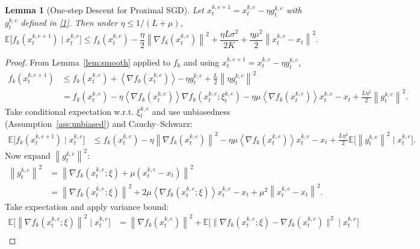 \documentclass{article}
\newtheorem{lemma}{Lemma}
\newcommand{\E}{\mathbb{E}}
\newcommand{\norm}[1]{\left\lVert#1\right\rVert}
\newcommand{\inner}[1]{\left\langle#1\right\rangle}
\begin{document}
\begin{lemma}[One‑step Descent for Proximal SGD]\label{lem:one_step}
Let $x_{t}^{k,e+1}=x_{t}^{k,e}-\eta g_{t}^{k,e}$ with $g_{t}^{k,e}$ defined in \eqref{1}. Then under $\eta\le 1/(L+\mu)$,
\[
\E\!\bigl[f_k(x_{t}^{k,e+1})\mid x_{t}^{k,e}\bigr]
\le
f_k(x_{t}^{k,e})-\frac{\eta}{2}\norm{\nabla f_k(x_{t}^{k,e})}^{2}
+\frac{\eta L\sigma^{2}}{2K}
+\frac{\eta\mu^{2}}{2}\norm{x_{t}^{k,e}-x_t}^{2}.
\]
\end{lemma}
\begin{proof}
From Lemma~\ref{lem:smooth} applied to $f_k$ and using $x_{t}^{k,e+1}=x_{t}^{k,e}-\eta g_{t}^{k,e}$,
\[
\begin{aligned}
f_k(x_{t}^{k,e+1})
&\le f_k(x_{t}^{k,e})
   +\inner{\nabla f_k(x_{t}^{k,e})}{-\,\eta g_{t}^{k,e}}
   +\frac{L}{2}\norm{\eta g_{t}^{k,e}}^{2}                                         \tag{Step 1}\\
&= f_k(x_{t}^{k,e})
   -\eta\inner{\nabla f_k(x_{t}^{k,e})}{\nabla f_k(x_{t}^{k,e};\xi_{t}^{k,e})}
   -\eta\mu\inner{\nabla f_k(x_{t}^{k,e})}{x_{t}^{k,e}-x_t}
   +\frac{L\eta^{2}}{2}\norm{g_{t}^{k,e}}^{2}.                                      \tag{Step 2}
\end{aligned}
\]
Take conditional expectation w.r.t. $\xi_{t}^{k,e}$ and use unbiasedness (Assumption~\ref{ass:unbiased}) and Cauchy–Schwarz:
\[
\begin{aligned}
\E\!\bigl[f_k(x_{t}^{k,e+1})\mid x_{t}^{k,e}\bigr]
&\le f_k(x_{t}^{k,e})
   -\eta\norm{\nabla f_k(x_{t}^{k,e})}^{2}
   -\eta\mu\inner{\nabla f_k(x_{t}^{k,e})}{x_{t}^{k,e}-x_t}
   +\frac{L\eta^{2}}{2}\E\!\bigl[\norm{g_{t}^{k,e}}^{2}\mid x_{t}^{k,e}\bigr].   \tag{Step 3}
\end{aligned}
\]
Now expand $\norm{g_{t}^{k,e}}^{2}$:
\[
\begin{aligned}
\norm{g_{t}^{k,e}}^{2}
&= \norm{\nabla f_k(x_{t}^{k,e};\xi)+\mu(x_{t}^{k,e}-x_t)}^{2}                      \tag{Step 4}\\
&= \norm{\nabla f_k(x_{t}^{k,e};\xi)}^{2}
   +2\mu\inner{\nabla f_k(x_{t}^{k,e};\xi)}{x_{t}^{k,e}-x_t}
   +\mu^{2}\norm{x_{t}^{k,e}-x_t}^{2}.                                            \tag{Step 5}
\end{aligned}
\]
Take expectation and apply variance bound:
\[
\begin{aligned}
\E\!\bigl[\norm{\nabla f_k(x_{t}^{k,e};\xi)}^{2}\mid x_{t}^{k,e}\bigr]
&= \norm{\nabla f_k(x_{t}^{k,e})}^{2}
   +\E\!\bigl[\|\nabla f_k(x_{t}^{k,e};\xi)-\nabla f_k(x_{t}^{k,e})\|^{2}\mid x_{t}^{k,e}\bigr] \\

\end{aligned}\]
\end{proof}
\end{document}
